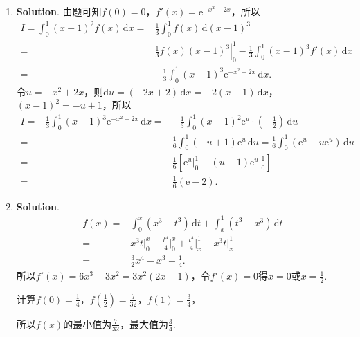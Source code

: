 \documentclass[../main.tex]{subfiles}
\begin{document}
\begin{enumerate}
    \item \textbf{Solution}. 由题可知$f(0)=0$，$f'(x)=\mathrm{e}^{-x^2+2x}$，所以
          \[
              \begin{aligned}
                  I = \int_{0}^{1}(x-1)^{2} f(x)\,\mathrm{d}x = {} & \frac{1}{3}\int_{0}^{1}f(x)\,\mathrm{d}(x-1)^{3}                                                  \\
                  = {}                                             & \left.\frac{1}{3}f(x)(x-1)^{3}\right|_{0}^{1}-\frac{1}{3}\int_{0}^{1}(x-1)^{3} f'(x)\,\mathrm{d}x \\
                  = {}                                             & -\frac{1}{3}\int_{0}^{1}(x-1)^{3} \mathrm{e}^{-x^2+2x}\,\mathrm{d}x.
              \end{aligned}
          \]
          令$u=-x^{2}+2x$，则$\mathrm{d}u=(-2x+2)\,\mathrm{d}x=-2(x-1)\,\mathrm{d}x$，$(x
              -1)^{2}=-u+1$，所以
          \[
              \begin{aligned}
                  I = -\frac{1}{3}\int_{0}^{1}(x-1)^{3} \mathrm{e}^{-x^2+2x}\,\mathrm{d}x = {} & -\frac{1}{3}\int_{0}^{1}(x-1)^{2}\mathrm{e}^{u}\cdot\left(-\frac{1}{2}\right)\,\mathrm{d}u                                      \\
                  = {}                                                                         & \frac{1}{6}\int_{0}^{1}(-u+1)\mathrm{e}^{u}\,\mathrm{d}u = \frac{1}{6}\int_{0}^{1}(\mathrm{e}^{u}-u\mathrm{e}^{u})\,\mathrm{d}u \\
                  = {}                                                                         & \frac{1}{6}\left[\mathrm{e}^{u}\Big|_{0}^{1}-(u-1)\mathrm{e}^{u}\Big|_{0}^{1}\right]                                            \\
                  = {}                                                                         & \frac{1}{6}(\mathrm{e}-2).
              \end{aligned}
          \]

    \item \textbf{Solution}.
          \[
              \begin{aligned}
                  f(x)= {} & \int_{0}^{x}(x^{3}-t^{3})\,\mathrm{d}t+\int_{x}^{1}(t^{3}-x^{3})\,\mathrm{d}t                     \\
                  = {}     & x^{3}t\bigg|_{0}^{x}-\frac{t^4}{4}\bigg|_{0}^{x}+\frac{t^4}{4}\bigg|_{x}^{1}-x^{3}t\bigg|_{x}^{1} \\
                  = {}     & \frac{3}{2}x^{4}-x^{3}+\frac{1}{4}.
              \end{aligned}
          \]
          所以$f'(x)=6x^{3}-3x^{2}=3x^{2}(2x-1)$，令$f'(x)=0$得$x=0$或$x=\frac{1}{2}$.

          计算$f(0)=\frac{1}{4}$，$f\left(\frac{1}{2}\right)=\frac{7}{32}$，$f(1)=\frac{3}{4}$，

          所以$f(x)$的最小值为$\frac{7}{32}$，最大值为$\frac{3}{4}$.
\end{enumerate}
\end{document}
